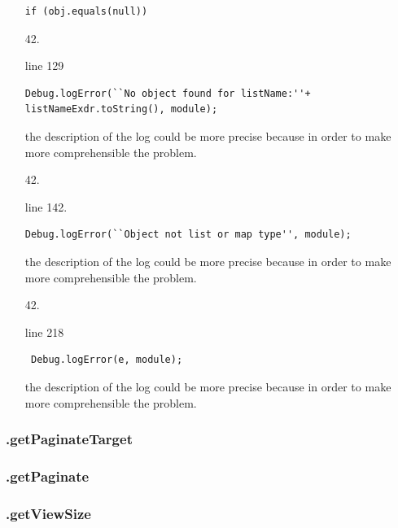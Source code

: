 \documentclass[english]{article}
\begin{document}
\begin{itemize}
{		\begin{lstlisting}
if (obj.equals(null))
		\end{lstlisting}}
	\item[42.]{line 129
		\begin{lstlisting}
Debug.logError(``No object found for listName:''+ listNameExdr.toString(), module);
		\end{lstlisting}
		the description of the log could be more precise because in order to make more comprehensible the problem.}
	\item[42.]{line 142.		\begin{lstlisting} 
Debug.logError(``Object not list or map type'', module);
		\end{lstlisting}
		the description of the log could be more precise because in order to make more comprehensible the problem.}
	\item[42.]{line 218
		\begin{lstlisting} 
 Debug.logError(e, module);
		\end{lstlisting}
		the description of the log could be more precise because in order to make more comprehensible the problem.}
	
\end{itemize}

\subsubsection*{.getPaginateTarget}
\subsubsection*{.getPaginate}
\subsubsection*{.getViewSize}
\end{document}
